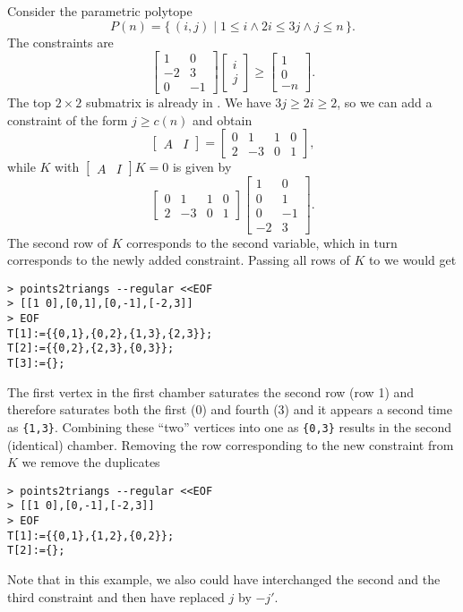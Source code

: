 \begin{example}
Consider the parametric polytope
$$
P(n) = \{\,
(i,j) \mid
1 \le i \wedge 2 i \le 3 j \wedge j \le n
\,\}
.
$$
The constraints are
$$
\begin{bmatrix}
1 & 0 \\
-2 & 3 \\
0 & -1
\end{bmatrix}
\begin{bmatrix}
i \\ j
\end{bmatrix}
\ge
\begin{bmatrix}
1 \\
0 \\
-n
\end{bmatrix}
.
$$
The top $2 \times 2$ submatrix is already in .
We have $3 j \ge 2i \ge 2$, so we can add a constraint
of the form $j \ge c(n)$ and obtain
$$
\begin{bmatrix}
A & I
\end{bmatrix}
=
\begin{bmatrix}
0 & 1 & 1 & 0
\\
2 & -3 & 0 & 1
\end{bmatrix}
,
$$
while $K$ with $\begin{bmatrix}A & I\end{bmatrix} K = 0$ is given
by
$$
\begin{bmatrix}
0 & 1 & 1 & 0
\\
2 & -3 & 0 & 1
\end{bmatrix}
\begin{bmatrix}
1 & 0 \\
0 & 1 \\
0 & -1 \\
-2 & 3
\end{bmatrix}
.
$$
The second row of $K$ corresponds to the second variable,
which in turn corresponds to the newly added constraint.
Passing all rows of $K$ to  we would get
\begin{verbatim}
> points2triangs --regular <<EOF
> [[1 0],[0,1],[0,-1],[-2,3]]
> EOF
T[1]:={{0,1},{0,2},{1,3},{2,3}};
T[2]:={{0,2},{2,3},{0,3}};
T[3]:={};
\end{verbatim}
The first vertex in the first chamber saturates the second row
(row 1) and therefore saturates both the first (0) and fourth (3)
and it appears a second time as \verb+{1,3}+.  Combining
these ``two'' vertices into one as \verb+{0,3}+ results in the
second (identical) chamber.
Removing the row corresponding to the new constraint from $K$
we remove the duplicates
\begin{verbatim}
> points2triangs --regular <<EOF
> [[1 0],[0,-1],[-2,3]]
> EOF
T[1]:={{0,1},{1,2},{0,2}};
T[2]:={};
\end{verbatim}
Note that in this example, we also could have interchanged
the second and the third constraint and then have replaced $j$ by $-j'$.
\end{example}

